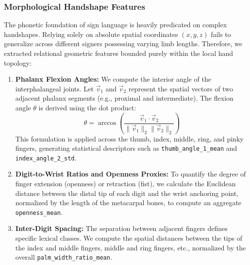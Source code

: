 \documentclass{ieeeaccess}
\begin{document}
\subsubsection{Morphological Handshape Features} 
The phonetic foundation of sign language is heavily predicated on complex handshapes. Relying solely on absolute spatial coordinates $(x,y,z)$ fails to generalize across different signers possessing varying limb lengths. Therefore, we extracted relational geometric features bounded purely within the local hand topology: 
\begin{enumerate} 
    \item \textbf{Phalanx Flexion Angles:} We compute the interior angle of the interphalangeal joints. Let $\vec{v}_1$ and $\vec{v}_2$ represent the spatial vectors of two adjacent phalanx segments (e.g., proximal and intermediate). The flexion angle $\theta$ is derived using the dot product: 
    \begin{equation} \label{eq:angle} 
    \theta = \arccos \left( \frac{\vec{v}_1 \cdot \vec{v}_2}{\lVert \vec{v}_1 \rVert_2 \lVert \vec{v}_2 \rVert_2} \right) 
    \end{equation} 
    This formulation is applied across the thumb, index, middle, ring, and pinky fingers, generating statistical descriptors such as \texttt{thumb\_angle\_1\_mean} and \texttt{index\_angle\_2\_std}. 
    \item \textbf{Digit-to-Wrist Ratios and Openness Proxies:} To quantify the degree of finger extension (openness) or retraction (fist), we calculate the Euclidean distance between the distal tip of each digit and the wrist anchoring point, normalized by the length of the metacarpal bones, to compute an aggregate \texttt{openness\_mean}.
    \item \textbf{Inter-Digit Spacing:} The separation between adjacent fingers defines specific lexical classes. We compute the spatial distances between the tips of the index and middle fingers, middle and ring fingers, etc., normalized by the overall \texttt{palm\_width\_ratio\_mean}. 
\end{enumerate}
\end{document}
